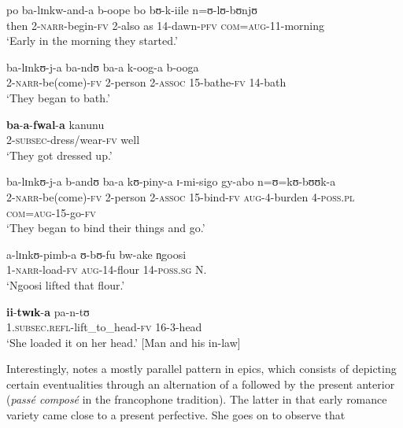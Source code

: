 \begin{exe}
\ex \label{exSubsecutivePreparationResult}
\begin{xlist}
\ex \gll po ba-lɪnkw-and-a b-oope bo bʊ-k-iile n=ʊ-lʊ-bʊnjʊ\\
then 2-\textsc{narr}-begin-\textsc{fv} 2-also as 14-dawn-\textsc{pfv} \textsc{com}=\textsc{aug}-11-morning\\
\glt \lq Early in the morning they started.'

\ex \label{exSubsecutivePreparationResultSentence2}\gll ba-lɪnkʊ-j-a ba-ndʊ ba-a k-oog-a b-ooga\\
2-\textsc{narr}-be(come)-\textsc{fv} 2-person 2-\textsc{assoc} 15-bathe-\textsc{fv} 14-bath\\
\glt \lq They began to bath.'

\ex \label{exSubsecutivePreparationResultSentence3}\gll \textbf{ba}-\textbf{a}-\textbf{fwal}-\textbf{a} kanunu\\
2-\textsc{subsec}-dress/wear-\textsc{fv} well\\
\glt \lq They got dressed up.'

\ex \label{exSubsecutivePreparationResultSentence4}\gll ba-lɪnkʊ-j-a b-andʊ ba-a kʊ-piny-a ɪ-mi-sigo gy-abo n=ʊ=kʊ-bʊʊk-a\\
2-\textsc{narr}-be(come)-\textsc{fv} 2-person 2-\textsc{assoc} 15-bind-\textsc{fv} \textsc{aug}-4-burden 4-\textsc{poss.pl} \textsc{com}=\textsc{aug}-15-go-\textsc{fv}\\
\glt \lq They began to bind their things and go.'

\ex \label{exSubsecutivePreparationResultSentence5} \gll a-lɪnkʊ-pimb-a ʊ-bʊ-fu bw-ake n̩goosi\\
1-\textsc{narr}-load-\textsc{fv} \textsc{aug}-14-flour 14-\textsc{poss.sg} N.\\
\glt \lq Ngoosi lifted that flour.'

\ex \label{exSubsecutivePreparationResultSentence6} \gll \textbf{ii}-\textbf{twɪk}-\textbf{a} pa-n-tʊ\\
1.\textsc{subsec}.\textsc{refl}-lift\_to\_head-\textsc{fv} 16-3-head\\
\glt \lq She loaded it on her head.' [Man and his in-law]
\end{xlist}
\end{exe}
Interestingly, \citet[ch. 6]{FleischmanS1990} notes a mostly parallel pattern in  epics, which consists of depicting certain eventualities through an alternation of a  followed by the present anterior (\textit{passé composé} in the francophone tradition). The latter in that early romance variety came close to a present perfective. She goes on to observe that

